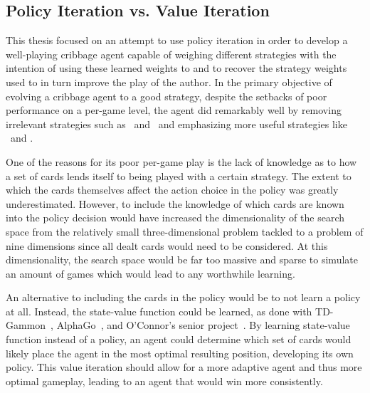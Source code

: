 

\subsection{Policy Iteration vs. Value Iteration}
\label{sec:disc-value}

This thesis focused on an attempt to use policy iteration
in order to develop a well-playing
cribbage agent capable of weighing different strategies
with the intention of using these learned weights to 
and to recover the strategy weights used to in turn
improve the play of the author.
%
In the primary objective of evolving a cribbage agent to a good strategy,
despite the setbacks of poor performance on a per-game level,
the agent did remarkably well
by removing irrelevant strategies
such as \handmaxmed\ and \peggingmaxmedgained\ 
and emphasizing more useful strategies
like \handmaxavg\ and \handmaxmin.
%

One of the reasons for its poor per-game play
is the lack of knowledge as to how a set of cards lends itself to being played
with a certain strategy.
%
The extent to which the cards themselves affect the action choice in the policy
was greatly underestimated.
%
However, %
to include the knowledge of which cards are known into the policy decision
would have increased the dimensionality of the search space from the relatively
small three-dimensional problem tackled to a problem of nine dimensions since
all dealt cards would need to be considered.
%
At this dimensionality,
the search space would be far too massive and sparse to simulate an amount of
games which would lead to any worthwhile learning.

An alternative to including the cards in the policy would be to not learn a
policy at all.
%
Instead,
the state-value function could be learned,
as done with TD-Gammon~\cite{tdgammon},
AlphaGo~\cite{deepmind_alphago,deepmind_alphago_zero},
and O'Connor's senior project~\cite{roconnor_cs486}.
%
By learning state-value function instead of a policy,
an agent could determine which set of cards would likely place the agent in the
most optimal resulting position,
developing its own policy.
%
This value iteration should allow for a more adaptive agent and thus more
optimal gameplay,
leading to an agent that would win more consistently.

%

